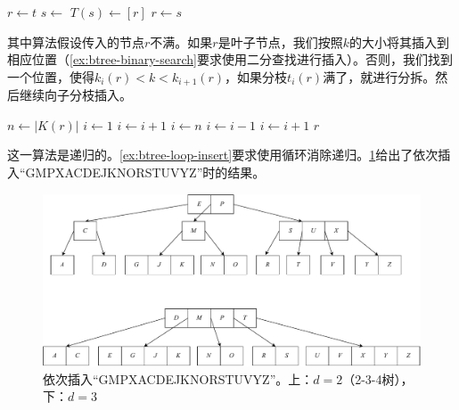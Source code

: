 \documentclass[b5paper]{ctexart}
\begin{document}
\begin{algorithmic}[1]
  \State $r \gets t$
   
    \State $s \gets$ 
    \State $T(s) \gets [ r ]$
    \State {}
    \State $r \gets s$
  \EndIf
  \State \Return {}
\EndFunction
\end{algorithmic}

其中算法假设传入的节点$r$不满。如果$r$是叶子节点，我们按照$k$的大小将其插入到相应位置（\cref{ex:btree-binary-search}要求使用二分查找进行插入）。否则，我们找到一个位置，使得$k_i(r) < k < k_{i+1}(r)$，如果分枝$t_i(r)$满了，就进行分拆。然后继续向子分枝插入。

\begin{algorithmic}[1]
  \State $n \gets |K(r)|$
    \State $i \gets 1$
      \State $i \gets i + 1$
    \EndWhile
    \State {}
  \Else
    \State $i \gets n$
      \State $i \gets i - 1$
    \EndWhile
      \State {}
        \State $i \gets i + 1$
      \EndIf
    \EndIf
    \State {}
  \EndIf
  \State \Return $r$
\EndFunction
\end{algorithmic}

这一算法是递归的。\cref{ex:btree-loop-insert}要求使用循环消除递归。\cref{fig:btree-insert}给出了依次插入``GMPXACDEJKNORSTUVYZ''时的结果。

\begin{figure}[htbp]
  \centering
  \includegraphics[scale=0.5]{img/btree-split-insert-example}
  \caption{依次插入``GMPXACDEJKNORSTUVYZ''。上：$d = 2$（2-3-4树），下：$d = 3$}
  \label{fig:btree-insert}
\end{figure}
\end{document}
